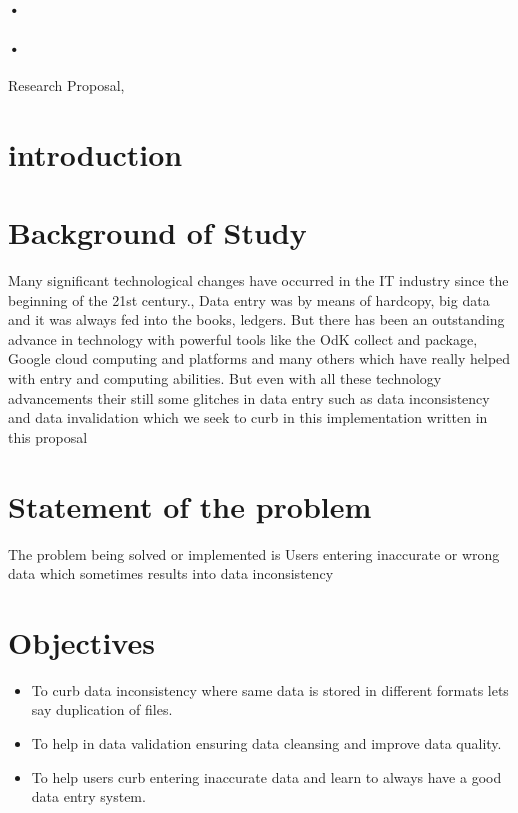 \documentclass[12pt,]{article}
\begin{document}
\begin{titlepage}
\paragraph*{•}
\paragraph*{•}
  \begin{flushright}
  Research Proposal,\\
 
 \tableofcontents

  \end{flushright}
\date{\today}
\end{titlepage}

\newpage




\section{introduction}
\section*{Background of Study}
Many significant technological changes have occurred in the IT industry since the beginning of the 21st century., Data entry was by means of hardcopy, big data and it was always fed into the books, ledgers. But there has been an outstanding advance in technology with powerful tools like the OdK collect and package, Google cloud computing and platforms and many others which have really helped with entry and computing abilities. But even with all these technology advancements their still some glitches in data entry such as data inconsistency and data invalidation which we seek to curb in this implementation written in this proposal
\section{Statement of the problem}
The problem being solved or implemented is Users entering inaccurate or wrong data which sometimes results into data inconsistency
\section{ Objectives}
\begin{itemize}
\item To curb data inconsistency where same data is stored in different formats lets say duplication of files.
\item To help in data validation ensuring data cleansing and improve data quality.
\item To help users curb entering inaccurate data and learn to always have a good data entry system.
\end{itemize}
\end{document}
